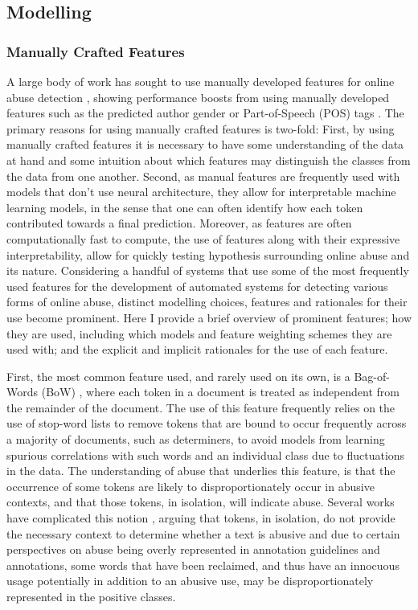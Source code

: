 \subsection{Modelling}
\subsubsection{Manually Crafted Features}

A large body of work has sought to use manually developed features for online abuse detection \citep{Davidson:2017,Waseem:2017,Ibrohim:2019,Vega:2019,Wiegand:2018,Tian:2020,Kumar:2019,Fortuna:2018}, showing performance boosts from using manually developed features such as the predicted author gender \citep{Waseem-Hovy:2016} or Part-of-Speech (POS) tags \citep{Davidson:2017}. The primary reasons for using manually crafted features is two-fold: First, by using manually crafted features it is necessary to have some understanding of the data at hand and some intuition about which features may distinguish the classes from the data from one another. Second, as manual features are frequently used with models that don't use neural architecture, they allow for interpretable machine learning models, in the sense that one can often identify how each token contributed towards a final prediction. Moreover, as features are often computationally fast to compute, the use of features along with their expressive interpretability, allow for quickly testing hypothesis surrounding online abuse and its nature.
Considering a handful of systems that use some of the most frequently used features for the development of automated systems for detecting various forms of online abuse, distinct modelling choices, features and rationales for their use become prominent. Here I provide a brief overview of prominent features; how they are used, including which models and feature weighting schemes they are used with; and the explicit and implicit rationales for the use of each feature.

First, the most common feature used, and rarely used on its own, is a Bag-of-Words (BoW) \citep{Fortuna:2018,Davidson:2017}, where each token in a document is treated as independent from the remainder of the document. The use of this feature frequently relies on the use of stop-word lists to remove tokens that are bound to occur frequently across a majority of documents, such as determiners, to avoid models from learning spurious correlations with such words and an individual class due to fluctuations in the data. The understanding of abuse that underlies this feature, is that the occurrence of some tokens are likely to disproportionately occur in abusive contexts, and that those tokens, in isolation, will indicate abuse. Several works have complicated this notion \citep[e.g.]{Waseem:2018,Davidson:2019}, arguing that tokens, in isolation, do not provide the necessary context to determine whether a text is abusive and due to certain perspectives on abuse being overly represented \citep{Waseem:2016} in annotation guidelines and annotations, some words that have been reclaimed, and thus have an innocuous usage potentially in addition to an abusive use, may be disproportionately represented in the positive classes.

